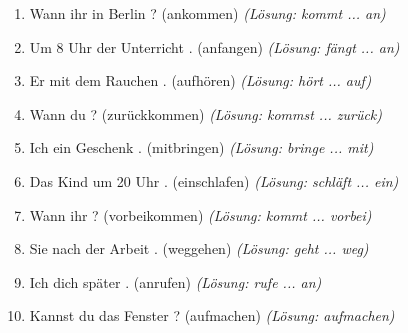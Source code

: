 \begin{enumerate}
    \item Wann \underline{\hspace{1cm}} ihr in Berlin \underline{\hspace{1cm}}? (ankommen) \quad \textit{(Lösung: kommt ... an)}
    \item Um 8 Uhr \underline{\hspace{1cm}} der Unterricht \underline{\hspace{1cm}}. (anfangen) \quad \textit{(Lösung: fängt ... an)}
    \item Er \underline{\hspace{1cm}} mit dem Rauchen \underline{\hspace{1cm}}. (aufhören) \quad \textit{(Lösung: hört ... auf)}
    \item Wann \underline{\hspace{1cm}} du \underline{\hspace{1cm}}? (zurückkommen) \quad \textit{(Lösung: kommst ... zurück)}
    \item Ich \underline{\hspace{1cm}} ein Geschenk \underline{\hspace{1cm}}. (mitbringen) \quad \textit{(Lösung: bringe ... mit)}
    \item Das Kind \underline{\hspace{1cm}} um 20 Uhr \underline{\hspace{1cm}}. (einschlafen) \quad \textit{(Lösung: schläft ... ein)}
    \item Wann \underline{\hspace{1cm}} ihr \underline{\hspace{1cm}}? (vorbeikommen) \quad \textit{(Lösung: kommt ... vorbei)}
    \item Sie \underline{\hspace{1cm}} nach der Arbeit \underline{\hspace{1cm}}. (weggehen) \quad \textit{(Lösung: geht ... weg)}
    \item Ich \underline{\hspace{1cm}} dich später \underline{\hspace{1cm}}. (anrufen) \quad \textit{(Lösung: rufe ... an)}
    \item Kannst du das Fenster \underline{\hspace{1cm}}? (aufmachen) \quad \textit{(Lösung: aufmachen)}
\end{enumerate}

\chapterend